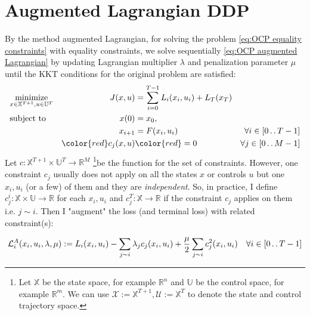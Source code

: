 \documentclass{report}
\newcommand{\twodots}{\mathinner {\ldotp \ldotp}}
\begin{document}
\chapter{Augmented Lagrangian DDP}
By the method augmented Lagrangian, for solving the problem \ref{eq:OCP equality constraints} with equality constraints, we solve sequentially \ref{eq:OCP augmented Lagrangian} by updating Lagrangian multiplier $\lambda$ and penalization parameter $\mu$ until the KKT conditions for the original problem are satisfied:
\begin{equation}
\label{eq:OCP equality constraints}
\begin{aligned}
&\underset{x \in \mathbb{X}^{T+1}, u \in \mathbb{U}^T}{\text{minimize}}          &J(x, u) &=\sum_{i = 0}^{T-1} L_i(x_i, u_i) + L_T(x_T) & \\
&\text{subject to}       &x(0)      &= x_0,  & \\ %
&				  &x_{i+1}  &= F(x_i, u_i)  &\forall i \in [0 \twodots T-1] \\
&	&\color{red} c_j(x, u) &\color{red} = 0 &\forall j \in [0 \twodots M-1]
\end{aligned}
\end{equation}
Let $c : \mathbb{X}^{T+1} \times \mathbb{U}^T \rightarrow \mathbb{R}^M$ \footnote{Let $\mathbb{X}$ be the state space, for example $\mathbb{R}^n$ and $\mathbb{U}$ be the control space, for example $\mathbb{R}^m$. We can use $\mathcal{X} := \mathbb{X}^{T+1}, \mathcal{U}:= \mathbb{X}^T$ to denote the state and control trajectory space.}be the function for the set of constraints. However, one constraint $c_j$ usually does not apply on all the states $x$ or controls $u$ but one $x_i, u_i$ (or a few) of them and they are \emph{independent}. So, in practice, I define $c_j^i : \mathbb{X} \times \mathbb{U} \rightarrow \mathbb{R}$ for each $x_i, u_i$ and $c_j^T : \mathbb{X} \rightarrow \mathbb{R}$ if the constraint $c_j$ applies on them i.e. $j \sim i$. Then I "augment" the loss (and terminal loss) with related constraint(s): 
\begin{tcolorbox}
\begin{equation}
\mathcal{L}^A_i(x_i, u_i, \lambda, \mu) := L_i(x_i, u_i) 
-\sum_{j \sim i}\lambda_j c_j(x_i, u_i) + \frac{\mu}{2} \sum_{j \sim i} c_j^2(x_i, u_i) \quad \forall i \in [0 \twodots T-1]
\end{equation}
\end{tcolorbox}
\end{document}
